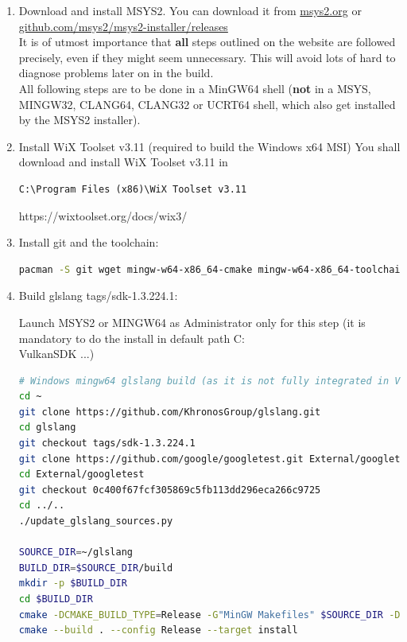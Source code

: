 \begin{enumerate}

\item Download and install MSYS2. You can download it from \href{https://www.msys2.org/}{msys2.org} or \href{https://github.com/msys2/msys2-installer/releases}{github.com/msys2/msys2-installer/releases}\\
It is of utmost importance that \textbf{all} steps outlined on the website are followed precisely, even if they might
seem unnecessary.
This will avoid lots of hard to diagnose problems later on in the build.\\

All following steps are to be done in a MinGW64 shell (\textbf{not} in a MSYS, MINGW32, CLANG64, CLANG32 or UCRT64 shell,
which also get installed by the MSYS2 installer).

\item Install WiX Toolset v3.11 (required to build the Windows x64 MSI)
You shall download and install WiX Toolset v3.11 in \begin{verbatim}C:\Program Files (x86)\WiX Toolset v3.11\end{verbatim}
https://wixtoolset.org/docs/wix3/

\item Install git and the toolchain:

\begin{lstlisting}[language=sh, numbers=none]
pacman -S git wget mingw-w64-x86_64-cmake mingw-w64-x86_64-toolchain
\end{lstlisting}

\item Build glslang tags/sdk-1.3.224.1:

Launch MSYS2 or MINGW64 as Administrator only for this step (it is mandatory to do the install in default path C:\\VulkanSDK ...)
\begin{lstlisting}[language=sh, numbers=none]
# Windows mingw64 glslang build (as it is not fully integrated in VulkanSDK-1.3.224.1 for Windows and built with Visual Studio 2017)
cd ~
git clone https://github.com/KhronosGroup/glslang.git
cd glslang
git checkout tags/sdk-1.3.224.1
git clone https://github.com/google/googletest.git External/googletest
cd External/googletest
git checkout 0c400f67fcf305869c5fb113dd296eca266c9725
cd ../..
./update_glslang_sources.py

SOURCE_DIR=~/glslang
BUILD_DIR=$SOURCE_DIR/build
mkdir -p $BUILD_DIR
cd $BUILD_DIR
cmake -DCMAKE_BUILD_TYPE=Release -G"MinGW Makefiles" $SOURCE_DIR -DCMAKE_INSTALL_PREFIX="$(pwd)/install"
cmake --build . --config Release --target install
\end{lstlisting}


\end{enumerate}

